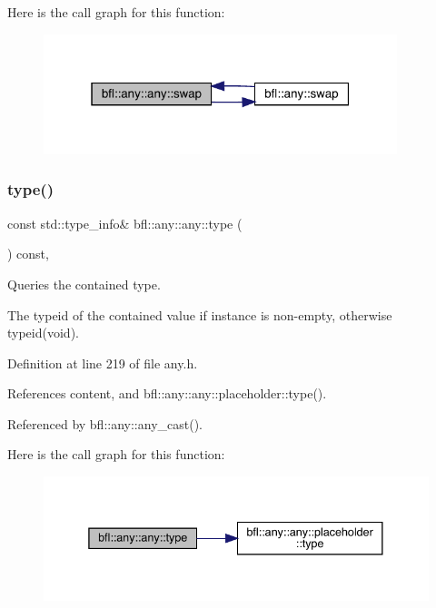 Here is the call graph for this function\+:
\nopagebreak
\begin{figure}[H]
\begin{center}
\leavevmode
\includegraphics[width=292pt]{classbfl_1_1any_1_1any_a0441e5816aa5ef4721f134868b7ca402_cgraph}
\end{center}
\end{figure}
\mbox{\label{classbfl_1_1any_1_1any_ad84c3b30ce2ed9d04fe28465b60f2500}} 
\subsubsection{\texorpdfstring{type()}{type()}}
{\footnotesize\ttfamily const std\+::type\+\_\+info\& bfl\+::any\+::any\+::type (\begin{DoxyParamCaption}{ }\end{DoxyParamCaption}) const\hspace{0.3cm}{\ttfamily [inline]}, {\ttfamily [noexcept]}}



Queries the contained type. 

The typeid of the contained value if instance is non-\/empty, otherwise typeid(void). 

Definition at line 219 of file any.\+h.



References content, and bfl\+::any\+::any\+::placeholder\+::type().



Referenced by bfl\+::any\+::any\+\_\+cast().

Here is the call graph for this function\+:
\nopagebreak
\begin{figure}[H]
\begin{center}
\leavevmode
\includegraphics[width=338pt]{classbfl_1_1any_1_1any_ad84c3b30ce2ed9d04fe28465b60f2500_cgraph}
\end{center}
\end{figure}


